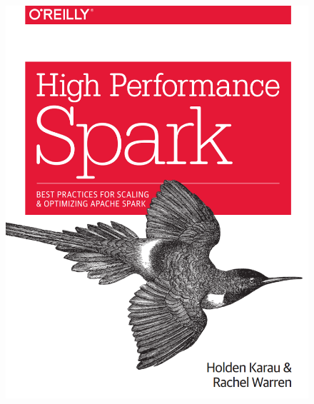 \begin{frame}
\begin{figure}[ht]
\begin{minipage}[c][1\width]{
			0.3\textwidth}
		\includegraphics[width=\linewidth]{./Figures/chapter-00/spark-high-performance.png}
	\end{minipage}
\hfill
	\begin{minipage}[c][1\width]{
		0.3\textwidth}
	\centering

\end{minipage}
\end{figure}
\end{frame}
